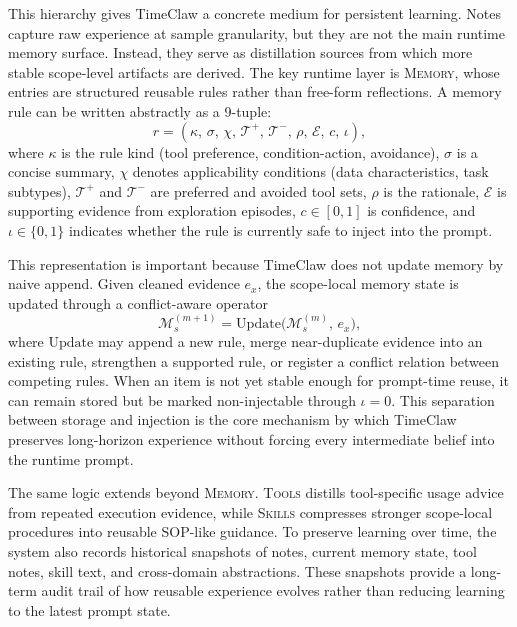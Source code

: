 This hierarchy gives TimeClaw a concrete medium for persistent learning. Notes capture raw experience at sample granularity, but they are not the main runtime memory surface. Instead, they serve as distillation sources from which more stable scope-level artifacts are derived. The key runtime layer is \textsc{Memory}, whose entries are structured reusable rules rather than free-form reflections. A memory rule can be written abstractly as a 9-tuple:
\begin{equation}
\label{eq:rule}
r = (\kappa,\,\sigma,\,\chi,\,\mathcal{T}^{+},\,\mathcal{T}^{-},\,\rho,\,\mathcal{E},\,c,\,\iota),
\end{equation}
where $\kappa$ is the rule kind (\eg tool preference, condition-action, avoidance), $\sigma$ is a concise summary, $\chi$ denotes applicability conditions (\eg data characteristics, task subtypes), $\mathcal{T}^{+}$ and $\mathcal{T}^{-}$ are preferred and avoided tool sets, $\rho$ is the rationale, $\mathcal{E}$ is supporting evidence from exploration episodes, $c\in[0,1]$ is confidence, and $\iota\in\{0,1\}$ indicates whether the rule is currently safe to inject into the prompt.

This representation is important because TimeClaw does not update memory by naive append. Given cleaned evidence $e_x$, the scope-local memory state is updated through a conflict-aware operator
\begin{equation}
\mathcal{M}_{s}^{(m+1)} = \mathrm{Update}\!\bigl(\mathcal{M}_{s}^{(m)},\, e_x\bigr),
\end{equation}
where $\mathrm{Update}$ may append a new rule, merge near-duplicate evidence into an existing rule, strengthen a supported rule, or register a conflict relation between competing rules. When an item is not yet stable enough for prompt-time reuse, it can remain stored but be marked non-injectable through $\iota=0$. This separation between storage and injection is the core mechanism by which TimeClaw preserves long-horizon experience without forcing every intermediate belief into the runtime prompt.

The same logic extends beyond \textsc{Memory}. \textsc{Tools} distills tool-specific usage advice from repeated execution evidence, while \textsc{Skills} compresses stronger scope-local procedures into reusable SOP-like guidance. To preserve learning over time, the system also records historical snapshots of notes, current memory state, tool notes, skill text, and cross-domain abstractions. These snapshots provide a long-term audit trail of how reusable experience evolves rather than reducing learning to the latest prompt state.

